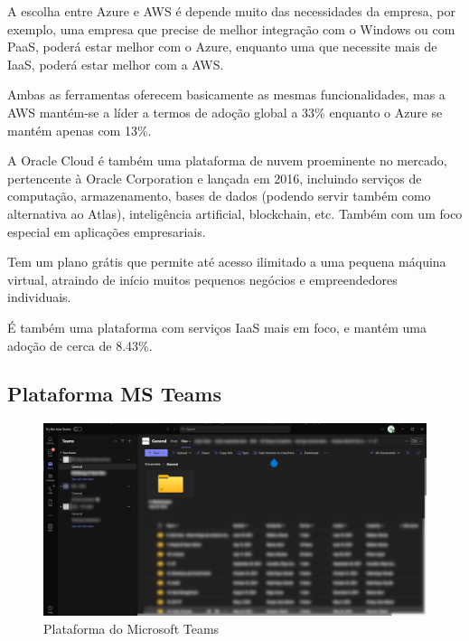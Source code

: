                 A escolha entre Azure e AWS é depende muito das necessidades da empresa, por exemplo, uma empresa que precise de melhor integração com o Windows ou com PaaS, poderá estar melhor com o Azure, enquanto uma que necessite mais de IaaS, poderá estar melhor com a AWS.
                
                Ambas as ferramentas oferecem basicamente as mesmas funcionalidades, mas a AWS mantém-se a líder a termos de adoção global a 33\% enquanto o Azure se mantém apenas com 13\%\cite{aws-vs-azure}.

            \label{competidores-oraclecloud}

                A Oracle Cloud é também uma plataforma de nuvem proeminente no mercado, pertencente à Oracle Corporation e lançada em 2016\cite{launch-orcale-cloud}, incluindo serviços de computação, armazenamento, bases de dados (podendo servir também como alternativa ao Atlas), inteligência artificial, blockchain, etc. Também com um foco especial em aplicações empresariais.

                Tem um plano grátis que permite até acesso ilimitado a uma pequena máquina virtual, atraindo de início muitos pequenos negócios e empreendedores individuais.

                É também uma plataforma com serviços IaaS mais em foco, e mantém uma adoção de cerca de 8.43\%\cite{marketshare-oracle-cloud}.

    \subsection{Plataforma MS Teams}
    
        \begin{figure}[htbp]
            \centering
            \includegraphics[width=\textwidth]{imgs/MSTeams.png} %
            \caption{Plataforma do Microsoft Teams}\label{fig:msteams-ui}
        \end{figure}

